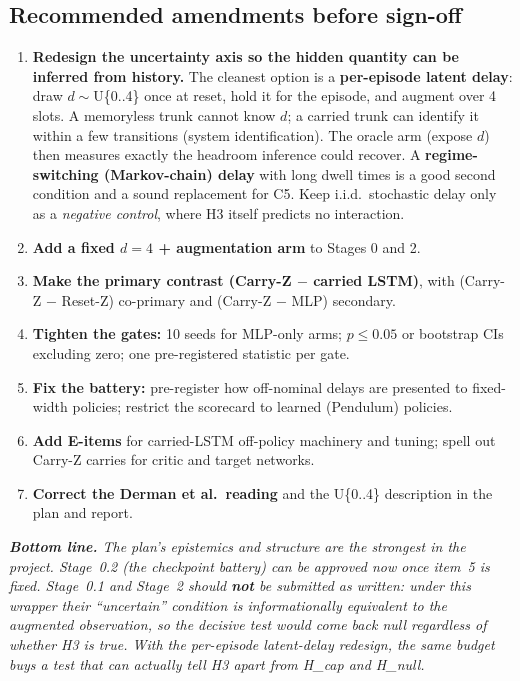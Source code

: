 \documentclass[11pt]{article}
\newenvironment{keybox}{\par\smallskip\noindent\begin{minipage}{\textwidth}\color{black}\itshape}{\end{minipage}\par\smallskip}
\begin{document}
\subsection{Recommended amendments before sign-off}
\label{sec:amend}
\begin{enumerate}
  \item \textbf{Redesign the uncertainty axis so the hidden quantity can be inferred from history.} The cleanest option is a \textbf{per-episode latent delay}: draw $d\sim$U\{0..4\} once at reset, hold it for the episode, and augment over 4 slots. A memoryless trunk cannot know $d$; a carried trunk can identify it within a few transitions (system identification). The oracle arm (expose $d$) then measures exactly the headroom inference could recover. A \textbf{regime-switching (Markov-chain) delay} with long dwell times is a good second condition and a sound replacement for C5. Keep i.i.d.\ stochastic delay only as a \emph{negative control}, where H3 itself predicts no interaction.
  \item \textbf{Add a fixed $d=4$ + augmentation arm} to Stages 0 and 2.
  \item \textbf{Make the primary contrast (Carry-Z $-$ carried LSTM)}, with (Carry-Z $-$ Reset-Z) co-primary and (Carry-Z $-$ MLP) secondary.
  \item \textbf{Tighten the gates:} 10 seeds for MLP-only arms; $p\le0.05$ or bootstrap CIs excluding zero; one pre-registered statistic per gate.
  \item \textbf{Fix the battery:} pre-register how off-nominal delays are presented to fixed-width policies; restrict the scorecard to learned (Pendulum) policies.
  \item \textbf{Add E-items} for carried-LSTM off-policy machinery and tuning; spell out Carry-Z carries for critic and target networks.
  \item \textbf{Correct the Derman et al.\ reading} and the U\{0..4\} description in the plan and report.
\end{enumerate}

\begin{keybox}
\textbf{Bottom line.} The plan's epistemics and structure are the strongest in the project. Stage~0.2 (the checkpoint battery) can be approved now once item~5 is fixed. Stage~0.1 and Stage~2 should \textbf{not} be submitted as written: under this wrapper their ``uncertain'' condition is informationally equivalent to the augmented observation, so the decisive test would come back null regardless of whether H3 is true. With the per-episode latent-delay redesign, the same budget buys a test that can actually tell H3 apart from H\_cap and H\_null.
\end{keybox}
\end{document}
